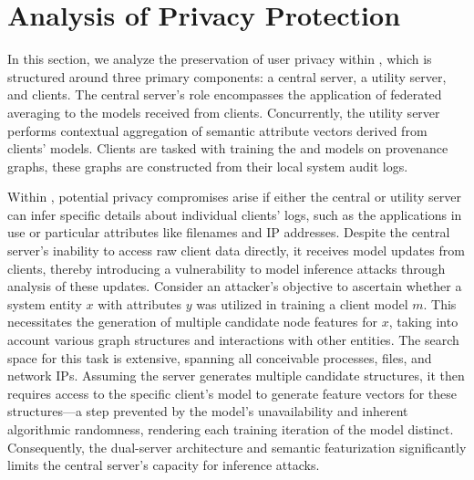 \section{Analysis of Privacy Protection}



In this section, we analyze the preservation of user privacy within \Sys, which is structured around three primary components: a central server, a utility server, and clients. The central server's role encompasses the application of federated averaging to the \gnnshort models received from clients. Concurrently, the utility server performs contextual aggregation of semantic attribute vectors derived from clients' \wordvec models. Clients are tasked with training the \wordvec and \gnnshort models on provenance graphs, these graphs are constructed from their local system audit logs.

Within \Sys, potential privacy compromises arise if either the central or utility server can infer specific details about individual clients' logs, such as the applications in use or particular attributes like filenames and IP addresses. Despite the central server's inability to access raw client data directly, it receives model updates from clients, thereby introducing a vulnerability to model inference attacks through analysis of these updates. Consider an attacker's objective to ascertain whether a system entity \(x\) with attributes \(y\) was utilized in training a client model \(m\). This necessitates the generation of multiple candidate node features for \(x\), taking into account various graph structures and interactions with other entities. The search space for this task is extensive, spanning all conceivable processes, files, and network IPs. Assuming the server generates multiple candidate structures, it then requires access to the specific client's \wordvec model to generate feature vectors for these structures—a step prevented by the model's unavailability and inherent algorithmic randomness, rendering each training iteration of the \wordvec model distinct. Consequently, the dual-server architecture and semantic featurization significantly limits the central server's capacity for inference attacks.

